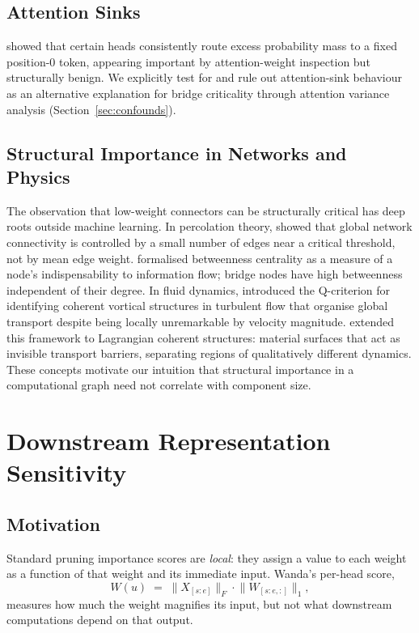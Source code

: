 \documentclass[11pt,a4paper]{article}
\theoremstyle{definition}
\theoremstyle{plain}
\begin{document}
\subsection{Attention Sinks}

\citet{xiao2024sinks} showed that certain heads consistently route excess
probability mass to a fixed position-0 token, appearing important by
attention-weight inspection but structurally benign.
We explicitly test for and rule out attention-sink behaviour as an
alternative explanation for bridge criticality through attention variance
analysis (Section~\ref{sec:confounds}).

\subsection{Structural Importance in Networks and Physics}

The observation that low-weight connectors can be structurally critical
has deep roots outside machine learning.
In percolation theory, \citet{broadbent1957percolation} showed that global
network connectivity is controlled by a small number of edges near a
critical threshold, not by mean edge weight.
\citet{freeman1977betweenness} formalised betweenness centrality as a
measure of a node's indispensability to information flow; bridge nodes have
high betweenness independent of their degree.
In fluid dynamics, \citet{hunt1988eddies} introduced the Q-criterion for
identifying coherent vortical structures in turbulent flow that organise
global transport despite being locally unremarkable by velocity magnitude.
\citet{haller2000lagrangian} extended this framework to Lagrangian
coherent structures: material surfaces that act as invisible transport
barriers, separating regions of qualitatively different dynamics.
These concepts motivate our intuition that structural importance in a
computational graph need not correlate with component size.

\section{Downstream Representation Sensitivity}
\label{sec:method}

\subsection{Motivation}
\label{sec:motivation}

Standard pruning importance scores are \emph{local}: they assign a value
to each weight as a function of that weight and its immediate input.
Wanda's per-head score,
\begin{equation}
    W(u) \;=\;
    \bigl\|X_{[s:e]}\bigr\|_{F}
    \cdot
    \bigl\|W_{[s:e,:]}\bigr\|_{1},
    \label{eq:wanda}
\end{equation}
measures how much the weight magnifies its input, but not what downstream
computations depend on that output.
\end{document}
